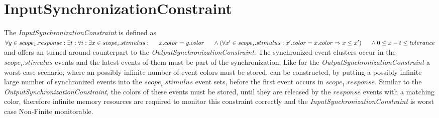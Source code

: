 \section{InputSynchronizationConstraint}
	The \emph{InputSynchronizationConstraint} is defined as\\[10pt]
	\begin{math}
		\forall y\in scope_1.response: \exists t: \forall i: \exists x\in scope_i.stimulus:\\
		\text{\hspace{.5cm}} x.color = y.color\\
		\text{\hspace{.5cm}}\land (\forall x'\in scope_i.stimulus: x'.color=x.color \Rightarrow x\leq x')\\
		\text{\hspace{.5cm}}\land 0\leq x-t\leq tolerance
	\end{math}\\[10pt]
	and offers an turned around counterpart to the \emph{OutputSynchronizationConstraint}. The synchronized event clusters occur in the $scope_i.stimulus$ events and the latest events of them must be part of the synchronization. Like for the \emph{OutputSynchronizationConstraint} a worst case scenario, where an possibly infinite number of event colors must be stored, can be constructed, by putting a possibly infinite large number of synchronized events into the $scope_i.stimulus$ event sets, before the first event occurs in $scope_1.response$. Similar to the  \emph{OutputSynchronizationConstraint}, the colors of these events must be stored, until they are released by the $response$ events with a matching color, therefore infinite memory resources are required to monitor this constraint correctly and the \emph{InputSynchronizationConstraint} is worst case Non-Finite monitorable.